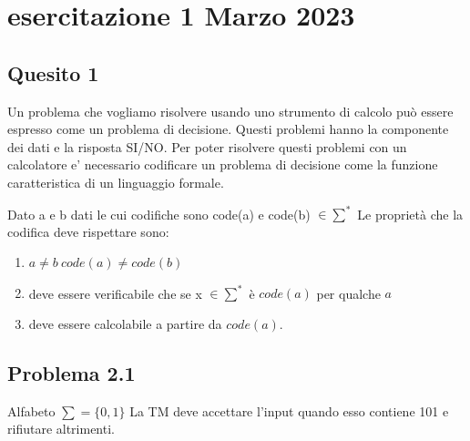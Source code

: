 \documentclass[a4paper, 12pt]{article}
\begin{document}
\section{esercitazione 1 Marzo 2023}
\subsection{Quesito 1}
Un problema che vogliamo risolvere usando uno strumento di calcolo pu\`o essere espresso come un problema di decisione. Questi problemi hanno la componente dei dati e la risposta SI/NO. Per poter risolvere questi problemi con un calcolatore e' necessario codificare un problema di decisione come la funzione caratteristica di un linguaggio formale.

Dato a e b dati le cui codifiche sono code(a) e code(b) $\in \sum^*$
Le propriet\`a che la codifica deve rispettare sono: 
\begin{enumerate}
\item $a \ne b \ code(a) \neq code(b)$
\item deve essere verificabile che se x $\in \sum^*$ \`e $code(a)$ per qualche $a$
\item deve essere calcolabile a partire da $code(a).$
\end{enumerate}
\subsection{Problema 2.1}
Alfabeto $\sum = \{0,1\}$
La TM deve accettare l'input quando esso contiene 101 e rifiutare altrimenti.\\
\end{document}
